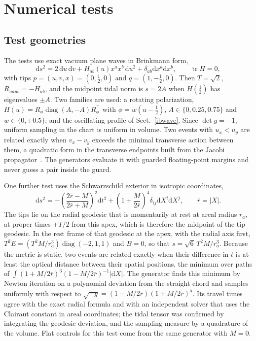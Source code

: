 \documentclass[11pt,a4paper]{article}
\newcommand{\dd}{\mathrm d}
\begin{document}
\section{Numerical tests}\label{tests}
\subsection{Test geometries}
The tests use exact vacuum plane waves in Brinkmann form,
\begin{equation}
 \dd s^2=2\,\dd u\,\dd v+H_{ab}(u)x^ax^b\,\dd u^2+\delta_{ab}\dd x^a\dd x^b,
 \qquad\operatorname{tr}H=0, \label{wave}
\end{equation}
with tips $p=(u,v,x)=(0,\tfrac12,0)$ and $q=(1,-\tfrac12,0)$. Then
$T=\sqrt2$, $R_{uaub}=-H_{ab}$, and the midpoint tidal norm is $s=2A$ when
$H(\tfrac12)$ has eigenvalues $\pm A$. Two families are used: a rotating
polarization, $H(u)=R_\phi\operatorname{diag}(A,-A)R_\phi^{\!\top}$ with
$\phi=w(u-\tfrac12)$, $A\in\{0,0.25,0.75\}$ and $w\in\{0,\pm0.5\}$; and the
oscillating profile of Sect.~\ref{ibwave}. Since $\det g=-1$, uniform
sampling in the chart is uniform in volume. Two events with $u_x<u_y$ are
related exactly when $v_x-v_y$ exceeds the minimal transverse action between
them, a quadratic form in the transverse endpoints built from the Jacobi
propagator~\cite{harte}. The generators evaluate it with guarded
floating-point margins and never guess a pair inside the guard.

One further test uses the Schwarzschild exterior in isotropic coordinates,
\begin{equation}
 \dd s^2=-\left(\frac{2\bar r-M}{2\bar r+M}\right)^{\!2}\dd t^2
 +\left(1+\frac{M}{2\bar r}\right)^{\!4}\delta_{ij}\dd X^i\dd X^j,
 \qquad\bar r=|X|. \label{schw}
\end{equation}
The tips lie on the radial geodesic that is momentarily at rest at areal
radius $r_a$, at proper times $\mp T/2$ from this apex, which is therefore
the midpoint of the tip geodesic. In the rest frame of that geodesic at the
apex, with the radial axis first,
$T^2E=(T^2M/r_a^3)\operatorname{diag}(-2,1,1)$ and $B=0$, so that
$s=\sqrt6\,T^2M/r_a^3$. Because the metric is static, two events are related
exactly when their difference in $t$ is at least the optical distance
between their spatial positions, the minimum over paths of
$\int(1+M/2\bar r)^3(1-M/2\bar r)^{-1}|\dd X|$. The generator finds this
minimum by Newton iteration on a polynomial deviation from the straight
chord and samples uniformly with respect to
$\sqrt{-g}=(1-M/2\bar r)(1+M/2\bar r)^5$. Its travel times
agree with the exact radial formula and with an independent solver that uses
the Clairaut constant in areal coordinates; the tidal tensor was confirmed
by integrating the geodesic deviation, and the sampling measure by a
quadrature of the volume. Flat controls for this test come from the same
generator with $M=0$.
\end{document}
